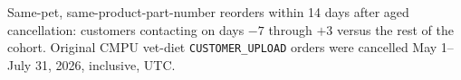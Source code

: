 Same-pet, same-product-part-number reorders within 14 days after aged cancellation: customers contacting on days $-7$ through $+3$ versus the rest of the cohort. Original CMPU vet-diet \texttt{CUSTOMER\_UPLOAD} orders were cancelled May 1--July 31, 2026, inclusive, UTC.
